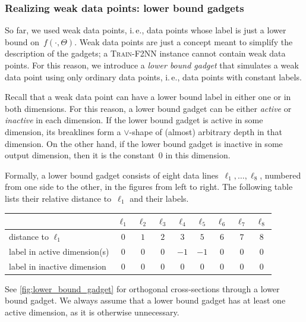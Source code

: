 \documentclass[11pt]{article}
\numberwithin{equation}{section}
\theoremstyle{definition}
\theoremstyle{plain}
\newcommand{\ie}{i.\,e.}
\newcommand{\problemname}[1]{\textnormal{\textsc{#1}}\xspace}
\newcommand{\trainNN}{\problemname{Train-F2NN}}
\theoremstyle{plain}
\begin{document}
\subsubsection{Realizing weak data points: lower bound gadgets}
\label{sec:lower_bound_gadget}

So far, we used weak data points, \ie, data points whose label is just a lower bound on~$f(\cdot, \Theta)$.
Weak data points are just a concept meant to simplify the description of the gadgets; a \trainNN instance cannot contain weak data points.
For this reason, we introduce a \emph{lower bound gadget} that simulates a weak data point using only ordinary data points, \ie, data points with constant labels.

Recall that a weak data point can have a lower bound label in either one or in both dimensions.
For this reason, a lower bound gadget can be either \emph{active} or \emph{inactive} in each dimension.
If the lower bound gadget is active in some dimension, its breaklines form a $\vee$-shape of (almost) arbitrary depth in that dimension.
On the other hand, if the lower bound gadget is inactive in some output dimension, then it is
%
the constant~$0$  %
in this dimension.

Formally, a lower bound gadget consists of eight data lines~$\ell_1, \ldots, \ell_8$, numbered from one side to the other, in the figures from left to right.
The following table lists their relative distance to~$\ell_1$ and their labels.

\begin{center}
    \begin{tabular}{lcccccccc}
        \toprule
        & $\ell_1$ & $\ell_2$ & $\ell_3$ & $\ell_4$ & $\ell_5$ & $\ell_6$ & $\ell_7$ & $\ell_8$ \\
        \midrule
        distance to $\ell_1$ & $0$ & $1$ & $2$ & $3$ & $5$ & $6$ & $7$ & $8$ \\
        label in active dimension(s) & $0$ & $0$ & $0$ & $-1$ & $-1$ & $0$ & $0$ & $0$ \\
        label in inactive dimension & $0$ & $0$ & $0$ & $0$ & $0$ & $0$ & $0$ & $0$ \\
        \bottomrule
    \end{tabular}
\end{center}
See \cref{fig:lower_bound_gadget} for orthogonal cross-sections through a lower bound gadget.
We always assume that a lower bound gadget has at least one active dimension, as it is otherwise unnecessary.
\end{document}
